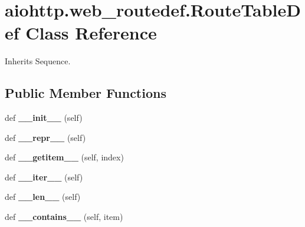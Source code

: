 \hypertarget{classaiohttp_1_1web__routedef_1_1_route_table_def}{}\section{aiohttp.\+web\+\_\+routedef.\+Route\+Table\+Def Class Reference}
\label{classaiohttp_1_1web__routedef_1_1_route_table_def}


Inherits Sequence.

\subsection*{Public Member Functions}
\begin{DoxyCompactItemize}
\item 
\mbox{\label{classaiohttp_1_1web__routedef_1_1_route_table_def_a71942417b267be5df9abe7f924cafb40}} 
def {\bfseries \+\_\+\+\_\+init\+\_\+\+\_\+} (self)
\item 
\mbox{\label{classaiohttp_1_1web__routedef_1_1_route_table_def_a9fa32a71f57c934da7ba12601b96fb22}} 
def {\bfseries \+\_\+\+\_\+repr\+\_\+\+\_\+} (self)
\item 
\mbox{\label{classaiohttp_1_1web__routedef_1_1_route_table_def_a86ad52660c9d566e4a341b30b2ef84b5}} 
def {\bfseries \+\_\+\+\_\+getitem\+\_\+\+\_\+} (self, index)
\item 
\mbox{\label{classaiohttp_1_1web__routedef_1_1_route_table_def_a3834c4d9d5a0776354474ab9f8eac983}} 
def {\bfseries \+\_\+\+\_\+iter\+\_\+\+\_\+} (self)
\item 
\mbox{\label{classaiohttp_1_1web__routedef_1_1_route_table_def_a242e07fdc46e56a86356f2e6ac0649d0}} 
def {\bfseries \+\_\+\+\_\+len\+\_\+\+\_\+} (self)
\item 
\mbox{\label{classaiohttp_1_1web__routedef_1_1_route_table_def_a7d905d2cd616afd78c5360c8e125d12f}} 
def {\bfseries \+\_\+\+\_\+contains\+\_\+\+\_\+} (self, item)

\end{DoxyCompactItemize}
